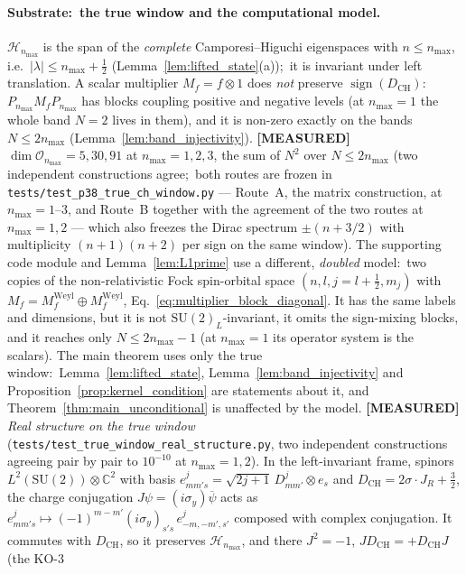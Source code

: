 \documentclass[11pt,a4paper]{article}
\theoremstyle{plain}
\theoremstyle{definition}
\newcommand{\nmax}{n_{\max}}
\newcommand{\Hilb}{\mathcal{H}}
\newcommand{\Op}{\mathcal{O}}
\newcommand{\SU}{\mathrm{SU}}
\newcommand{\DCH}{D_{\mathrm{CH}}}
\begin{document}
\paragraph{Substrate:\ the true window and the computational model.}  $\Hilb_{\nmax}$ is the span of the \emph{complete}
Camporesi--Higuchi eigenspaces with $n \le \nmax$, i.e.\ $|\lambda| \le
\nmax + \tfrac12$ (Lemma~\ref{lem:lifted_state}(a));\ it is invariant
under left translation.  A scalar multiplier $M_f = f \otimes 1$ does
\emph{not} preserve $\operatorname{sign}(\DCH)$:\ $P_{\nmax} M_f
P_{\nmax}$ has blocks coupling positive and negative levels (at $\nmax
= 1$ the whole band $N = 2$ lives in them), and it is non-zero exactly on
the bands $N \le 2\nmax$ (Lemma~\ref{lem:band_injectivity}).
\textbf{[MEASURED]} $\dim \Op_{\nmax} = 5, 30, 91$ at $\nmax = 1, 2,
3$, the sum of $N^2$ over $N \le 2\nmax$ (two independent constructions
agree;\ both routes are frozen in
\texttt{tests/test\_p38\_true\_ch\_window.py} --- Route~A, the matrix
construction, at $\nmax = 1$--$3$, and Route~B together with the
agreement of the two routes at $\nmax = 1, 2$ --- which also freezes the
Dirac spectrum $\pm(n + 3/2)$ with multiplicity $(n+1)(n+2)$ per sign on
the same window).  The supporting code module and Lemma~\ref{lem:L1prime}
use a different, \emph{doubled} model:\ two copies of the
non-relativistic Fock spin-orbital space $(n, l, j = l + \tfrac12, m_j)$
with $M_f = M_f^{\mathrm{Weyl}} \oplus M_f^{\mathrm{Weyl}}$,
Eq.~\eqref{eq:multiplier_block_diagonal}.  It has the same labels and
dimensions, but it is not $\SU(2)_L$-invariant, it omits the
sign-mixing blocks, and it reaches only $N \le 2\nmax - 1$ (at $\nmax =
1$ its operator system is the scalars).  The main theorem uses only the
true window:\ Lemma~\ref{lem:lifted_state},
Lemma~\ref{lem:band_injectivity} and
Proposition~\ref{prop:kernel_condition} are statements about it, and
Theorem~\ref{thm:main_unconditional} is unaffected by the model.
\textbf{[MEASURED]} \emph{Real structure on the true window}
(\texttt{tests/test\_true\_window\_real\_structure.py}, two
independent constructions agreeing pair by pair to $10^{-10}$ at
$\nmax = 1, 2$).  In the
left-invariant frame, spinors $L^2(\SU(2)) \otimes \mathbb{C}^2$ with
basis $e^j_{mm's} = \sqrt{2j+1}\,D^j_{mm'} \otimes e_s$ and
$\DCH = 2\sigma\cdot J_R + \tfrac32$, the charge conjugation
$J\psi = (i\sigma_y)\overline{\psi}$ acts as $e^j_{mm's} \mapsto
(-1)^{m-m'}(i\sigma_y)_{s's}\,e^j_{-m,-m',s'}$ composed with complex
conjugation.  It commutes with $\DCH$, so it preserves
$\Hilb_{\nmax}$, and there $J^2 = -1$, $J\DCH = +\DCH J$ (the KO-$3$
\end{document}

